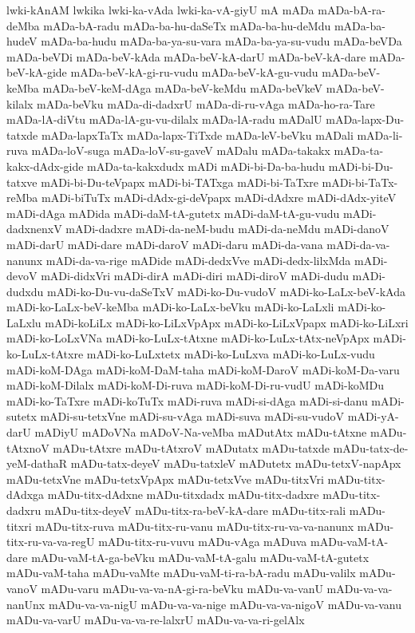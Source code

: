 {lwki-kAnAM
lwkika
lwki-ka-vAda
lwki-ka-vA-giyU
mA
mADa
mADa-bA-ra-deMba
mADa-bA-radu
mADa-ba-hu-daSeTx
mADa-ba-hu-deMdu
mADa-ba-hudeV
mADa-ba-hudu
mADa-ba-ya-su-vara
mADa-ba-ya-su-vudu
mADa-beVDa
mADa-beVDi
mADa-beV-kAda
mADa-beV-kA-darU
mADa-beV-kA-dare
mADa-beV-kA-gide
mADa-beV-kA-gi-ru-vudu
mADa-beV-kA-gu-vudu
mADa-beV-keMba
mADa-beV-keM-dAga
mADa-beV-keMdu
mADa-beVkeV
mADa-beV-kilalx
mADa-beVku
mADa-di-dadxrU
mADa-di-ru-vAga
mADa-ho-ra-Tare
mADa-lA-diVtu
mADa-lA-gu-vu-dilalx
mADa-lA-radu
mADalU
mADa-lapx-Du-tatxde
mADa-lapxTaTx
mADa-lapx-TiTxde
mADa-leV-beVku
mADali
mADa-li-ruva
mADa-loV-suga
mADa-loV-su-gaveV
mADalu
mADa-takakx
mADa-ta-kakx-dAdx-gide
mADa-ta-kakxdudx
mADi
mADi-bi-Da-ba-hudu
mADi-bi-Du-tatxve
mADi-bi-Du-teVpapx
mADi-bi-TATxga
mADi-bi-TaTxre
mADi-bi-TaTx-reMba
mADi-biTuTx
mADi-dAdx-gi-deVpapx
mADi-dAdxre
mADi-dAdx-yiteV
mADi-dAga
mADida
mADi-daM-tA-gutetx
mADi-daM-tA-gu-vudu
mADi-dadxnenxV
mADi-dadxre
mADi-da-neM-budu
mADi-da-neMdu
mADi-danoV
mADi-darU
mADi-dare
mADi-daroV
mADi-daru
mADi-da-vana
mADi-da-va-nanunx
mADi-da-va-rige
mADide
mADi-dedxVve
mADi-dedx-lilxMda
mADi-devoV
mADi-didxVri
mADi-dirA
mADi-diri
mADi-diroV
mADi-dudu
mADi-dudxdu
mADi-ko-Du-vu-daSeTxV
mADi-ko-Du-vudoV
mADi-ko-LaLx-beV-kAda
mADi-ko-LaLx-beV-keMba
mADi-ko-LaLx-beVku
mADi-ko-LaLxli
mADi-ko-LaLxlu
mADi-koLiLx
mADi-ko-LiLxVpApx
mADi-ko-LiLxVpapx
mADi-ko-LiLxri
mADi-ko-LoLxVNa
mADi-ko-LuLx-tAtxne
mADi-ko-LuLx-tAtx-neVpApx
mADi-ko-LuLx-tAtxre
mADi-ko-LuLxtetx
mADi-ko-LuLxva
mADi-ko-LuLx-vudu
mADi-koM-DAga
mADi-koM-DaM-taha
mADi-koM-DaroV
mADi-koM-Da-varu
mADi-koM-Dilalx
mADi-koM-Di-ruva
mADi-koM-Di-ru-vudU
mADi-koMDu
mADi-ko-TaTxre
mADi-koTuTx
mADi-ruva
mADi-si-dAga
mADi-si-danu
mADi-sutetx
mADi-su-tetxVne
mADi-su-vAga
mADi-suva
mADi-su-vudoV
mADi-yA-darU
mADiyU
mADoVNa
mADoV-Na-veMba
mADutAtx
mADu-tAtxne
mADu-tAtxnoV
mADu-tAtxre
mADu-tAtxroV
mADutatx
mADu-tatxde
mADu-tatx-de-yeM-dathaR
mADu-tatx-deyeV
mADu-tatxleV
mADutetx
mADu-tetxV-napApx
mADu-tetxVne
mADu-tetxVpApx
mADu-tetxVve
mADu-titxVri
mADu-titx-dAdxga
mADu-titx-dAdxne
mADu-titxdadx
mADu-titx-dadxre
mADu-titx-dadxru
mADu-titx-deyeV
mADu-titx-ra-beV-kA-dare
mADu-titx-rali
mADu-titxri
mADu-titx-ruva
mADu-titx-ru-vanu
mADu-titx-ru-va-va-nanunx
mADu-titx-ru-va-va-regU
mADu-titx-ru-vuvu
mADu-vAga
mADuva
mADu-vaM-tA-dare
mADu-vaM-tA-ga-beVku
mADu-vaM-tA-galu
mADu-vaM-tA-gutetx
mADu-vaM-taha
mADu-vaMte
mADu-vaM-ti-ra-bA-radu
mADu-valilx
mADu-vanoV
mADu-varu
mADu-va-va-nA-gi-ra-beVku
mADu-va-vanU
mADu-va-va-nanUnx
mADu-va-va-nigU
mADu-va-va-nige
mADu-va-va-nigoV
mADu-va-vanu
mADu-va-varU
mADu-va-va-re-lalxrU
mADu-va-va-ri-gelAlx
}

